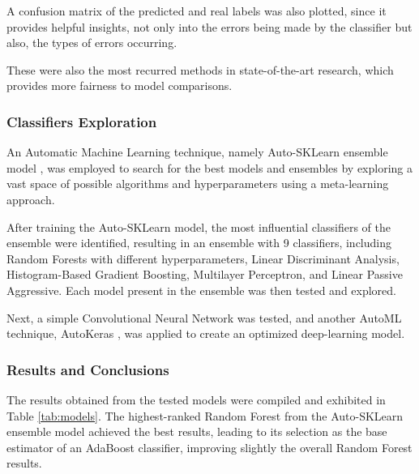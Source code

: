 A confusion matrix of the predicted and real labels was also plotted, since it provides helpful insights, not only into the errors being made by the classifier but also, the types of errors occurring.

These were also the most recurred methods in state-of-the-art research, which provides more fairness to model comparisons.

\subsubsection{Classifiers Exploration}

An Automatic Machine Learning technique, namely Auto-SKLearn ensemble model \cite{feurerneurips15a}, was employed to search for the best models and ensembles by exploring a vast space of possible algorithms and hyperparameters using a meta-learning approach.

After training the Auto-SKLearn model, the most influential classifiers of the ensemble were identified, resulting in an ensemble with 9 classifiers, including Random Forests with different hyperparameters, Linear Discriminant Analysis, Histogram-Based Gradient Boosting, Multilayer Perceptron, and Linear Passive Aggressive. Each model present in the ensemble was then tested and explored.

Next, a simple Convolutional Neural Network was tested, and another AutoML technique, AutoKeras \cite{jin2019auto}, was applied to create an optimized deep-learning model.

\subsubsection{Results and Conclusions}

The results obtained from the tested models were compiled and exhibited in Table \ref{tab:models}. The highest-ranked Random Forest from the Auto-SKLearn ensemble model achieved the best results, leading to its selection as the base estimator of an AdaBoost classifier, improving slightly the overall Random Forest results.

